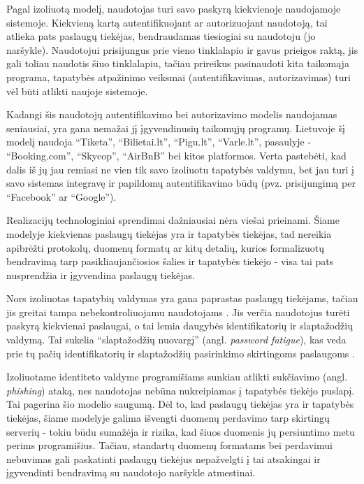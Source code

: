 Pagal izoliuotą modelį, naudotojas turi savo paskyrą kiekvienoje naudojamoje sistemoje. Kiekvieną kartą autentifikuojant ar autorizuojant
naudotoją, tai atlieka pats paslaugų tiekėjas, bendraudamas tiesiogiai su naudotoju (jo naršykle). Naudotojui prisijungus prie vieno tinklalapio ir gavus
prieigos raktą, jis gali toliau naudotis šiuo tinklalapiu, tačiau prireikus pasinaudoti kita taikomąja programa, tapatybės atpažinimo veiksmai (autentifikavimas, autorizavimas)
turi vėl būti atlikti naujoje sistemoje.


Kadangi šis naudotojų autentifikavimo bei autorizavimo modelis naudojamas seniausiai,
yra gana nemažai jį įgyvendinusių taikomųjų programų. Lietuvoje šį modelį naudoja
\enquote{Tiketa}, \enquote{Bilietai.lt}, \enquote{Pigu.lt},
\enquote{Varle.lt}, pasaulyje - \enquote{Booking.com}, \enquote{Skycop}, \enquote{AirBnB} bei kitos platformos. Verta
pastebėti, kad dalis iš jų jau remiasi ne vien tik savo izoliuotu tapatybės valdymu, bet jau turi į savo sistemas integravę ir papildomų autentifikavimo būdų
(pvz. prisijungimą per \enquote{Facebook} ar \enquote{Google}).

Realizacijų technologiniai sprendimai dažniausiai nėra viešai prieinami.
Šiame modelyje kiekvienas paslaugų tiekėjas yra ir tapatybės tiekėjas, tad nereikia
apibrėžti protokolų, duomenų formatų ar kitų detalių, kurios formalizuotų bendravimą tarp pasikliaujančiosios šalies ir
tapatybės tiekėjo - visa tai pats nusprendžia ir įgyvendina paslaugų tiekėjas.


Nors izoliuotas tapatybių valdymas yra gana paprastas paslaugų tiekėjams, tačiau jis greitai tampa
nebekontroliuojamu naudotojams \cite{Josang2005}. Jis verčia naudotojus turėti paskyrą kiekvienai paslaugai, o tai lemia
daugybės identifikatorių ir slaptažodžių valdymą. Tai sukelia \enquote{slaptažodžių nuovargį} (angl. 
\textit{password fatigue}), kas veda prie tų pačių identifikatorių ir slaptažodžių pasirinkimo skirtingoms paslaugoms \cite{Dhamija2008}.

Izoliuotame identiteto valdyme programišiams sunkiau atlikti sukčiavimo (angl. \textit{phishing}) ataką, nes naudotojas
nebūna nukreipiamas į tapatybės tiekėjo puslapį. Tai pagerina šio modelio saugumą. Dėl to, kad paslaugų tiekėjas yra ir tapatybės tiekėjas,
šiame modelyje galima išvengti duomenų perdavimo tarp skirtingų serverių - tokiu būdu sumažėja ir rizika, kad šiuos duomenis
jų persiuntimo metu perims programišius. Tačiau, standartų duomenų formatams bei perdavimui nebuvimas gali paskatinti paslaugų
tiekėjus nepažvelgti į tai atsakingai ir įgyvendinti bendravimą su naudotojo naršykle atmestinai.

